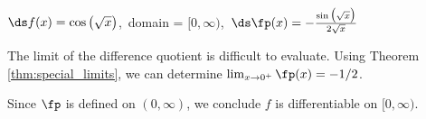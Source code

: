 {$\ds f(x) = \cos\big(\sqrt{x}\big)$,\ domain = $[0,\infty)$,\ $\ds\fp(x) = -\frac{\sin\big(\sqrt{x}\big)}{2\sqrt{x}}$
}
{The limit of the difference quotient is difficult to evaluate. Using Theorem \ref{thm:special_limits}, we can determine $\lim_{x\to0^+}\fp(x) = -1/2$.


Since $\fp$ is defined on $(0,\infty)$, we conclude $f$ is differentiable on $[0,\infty)$.
}
